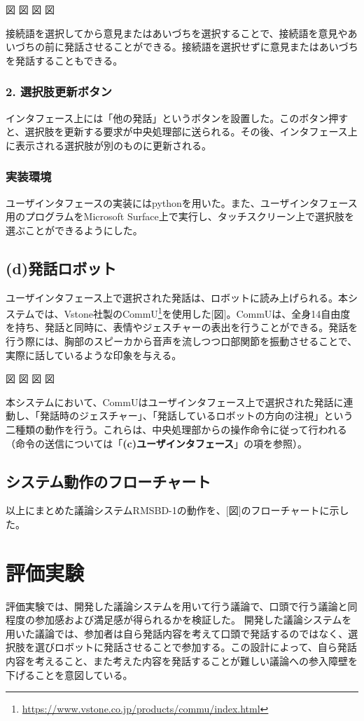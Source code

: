 \documentclass[11pt, a4paper]{jreport} %
\begin{document}
図
図
図
図


接続語を選択してから意見またはあいづちを選択することで、接続語を意見やあいづちの前に発話させることができる。接続語を選択せずに意見またはあいづちを発話することもできる。

\subsubsection*{2. 選択肢更新ボタン}
インタフェース上には「他の発話」というボタンを設置した。このボタン押すと、選択肢を更新する要求が中央処理部に送られる。その後、インタフェース上に表示される選択肢が別のものに更新される。

\subsubsection*{実装環境}
ユーザインタフェースの実装にはpythonを用いた。また、ユーザインタフェース用のプログラムをMicrosoft Surface上で実行し、タッチスクリーン上で選択肢を選ぶことができるようにした。%

\subsection*{(d)発話ロボット}
ユーザインタフェース上で選択された発話は、ロボットに読み上げられる。本システムでは、Vstone社製のCommU\footnote{\url{https://www.vstone.co.jp/products/commu/index.html}}を使用した[図]。CommUは、全身14自由度を持ち、発話と同時に、表情やジェスチャーの表出を行うことができる。発話を行う際には、胸部のスピーカから音声を流しつつ口部関節を振動させることで、実際に話しているような印象を与える。


図
図
図
図


本システムにおいて、CommUはユーザインタフェース上で選択された発話に連動し、「発話時のジェスチャー」、「発話しているロボットの方向の注視」という二種類の動作を行う。これらは、中央処理部からの操作命令に従って行われる（命令の送信については「\textbf{(c)ユーザインタフェース}」の項を参照）。


\subsection{システム動作のフローチャート}
以上にまとめた議論システムRMSBD-1の動作を、[図]のフローチャートに示した。


\section{評価実験}
\label{sec:実験1}
評価実験では、開発した議論システムを用いて行う議論で、口頭で行う議論と同程度の参加感および満足感が得られるかを検証した。
開発した議論システムを用いた議論では、参加者は自ら発話内容を考えて口頭で発話するのではなく、選択肢を選びロボットに発話させることで参加する。この設計によって、自ら発話内容を考えること、また考えた内容を発話することが難しい議論への参入障壁を下げることを意図している。
\end{document}
